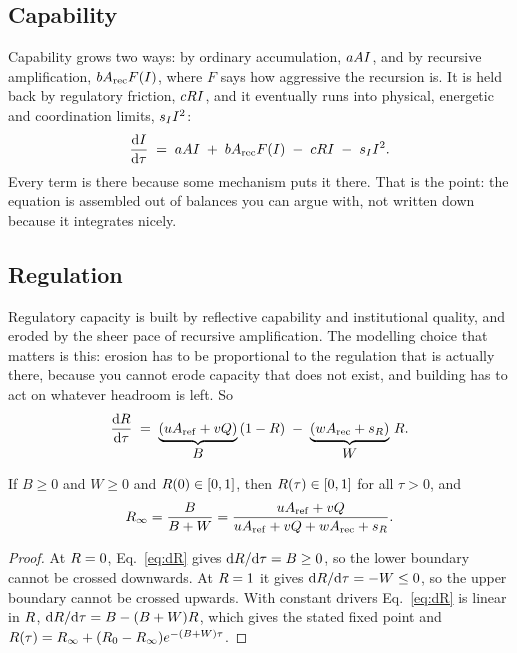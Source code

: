 \subsection{Capability}

Capability grows two ways: by ordinary accumulation, $a A I$, and by
recursive amplification, $b A_{\mathrm{rec}} F(I)$, where $F$ says how aggressive the
recursion is. It is held back by regulatory friction, $c R I$, and it
eventually runs into physical, energetic and coordination limits, $s_I I^2$:
\begin{equation}
  \frac{\mathrm{d}I}{\mathrm{d}\tau} \;=\; a A I \;+\; b A_{\mathrm{rec}} F(I) \;-\; c R I \;-\; s_I I^2 .
  \label{eq:dI}
\end{equation}
Every term is there because some mechanism puts it there. That is the point: the
equation is assembled out of balances you can argue with, not written down
because it integrates nicely.

\subsection{Regulation}
\label{sec:reg-eq}

Regulatory capacity is built by reflective capability and institutional quality,
and eroded by the sheer pace of recursive amplification. The modelling choice
that matters is this: erosion has to be proportional to the regulation that is
actually there, because you cannot erode capacity that does not exist, and
building has to act on whatever headroom is left. So
\begin{equation}
  \frac{\mathrm{d}R}{\mathrm{d}\tau} \;=\; \underbrace{(u A_{\mathrm{ref}} + v Q)}_{\textstyle B}\,(1-R)
                 \;-\; \underbrace{(w A_{\mathrm{rec}} + s_R)}_{\textstyle W}\,R .
  \label{eq:dR}
\end{equation}

\begin{proposition}
\label{prop:reg}
If $B \geq 0$ and $W \geq 0$ and $R(0) \in [0,1]$, then $R(\tau) \in [0,1]$
for all $\tau > 0$, and
\begin{equation}
  R_\infty = \frac{B}{B+W} = \frac{u A_{\mathrm{ref}} + v Q}{u A_{\mathrm{ref}} + v Q + w A_{\mathrm{rec}} + s_R} .
  \label{eq:Rinf}
\end{equation}
\end{proposition}

\begin{proof}
At $R = 0$, Eq.~\eqref{eq:dR} gives $\mathrm{d}R/\mathrm{d}\tau = B \geq 0$,
so the lower boundary cannot be crossed downwards. At $R = 1$ it gives
$\mathrm{d}R/\mathrm{d}\tau = -W \leq 0$, so the upper boundary cannot be
crossed upwards. With constant drivers Eq.~\eqref{eq:dR} is linear in $R$,
$\mathrm{d}R/\mathrm{d}\tau = B - (B+W)R$, which gives the stated fixed
point and $R(\tau)=R_\infty+(R_0-R_\infty)e^{-(B+W)\tau}$.
\end{proof}

